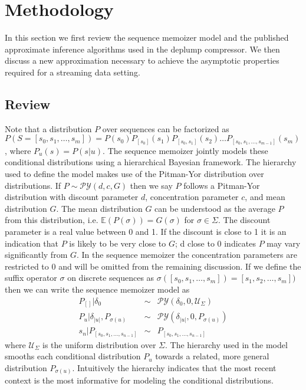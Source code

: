 \section{Methodology}
\label{section:methodology}
\newcommand{\PY}{\ensuremath{\mathcal{P}\mathcal{Y}}}

In this section we first review the sequence memoizer model and the published approximate inference algorithms used in the deplump compressor.  We then discuss a new approximation necessary to achieve the asymptotic properties required for a streaming data setting.

\subsection{Review}

Note that a distribution $P$ over sequences can be factorized as $P(S = [s_0, s_1, \ldots, s_m]) = P(s_0)P_{[s_0]}(s_1)P_{[s_0,s_1]}(s_2) \ldots P_{[s_0,s_1,\ldots,s_{m-1}]}(s_m)$, where $P_u(s) = P(s | u)$.  The sequence memoizer jointly models these conditional distributions using a hierarchical Bayesian framework.  The hierarchy used to define the model makes use of the Pitman-Yor \citep{Pitman1997} distribution over distributions. If $P \sim \PY(d,c,G)$ then we say $P$ follows a Pitman-Yor distribution with discount parameter $d$, concentration parameter $c$, and mean distribution $G$.  The mean distribution $G$ can be understood as the average $P$ from this distribution, i.e. $\mathbb{E}(P(\sigma)) = G(\sigma)$ for $\sigma \in \Sigma$.  The discount parameter is a real value between 0 and 1.  If the discount is close to 1 it is an indication that $P$ is likely to be very close to $G$; d close to 0 indicates $P$ may vary significantly from $G$.  In the sequence memoizer the concentration parameters are restricted to 0 and will be omitted from the remaining discussion. If we define the suffix operator $\sigma$ on discrete sequences as $\sigma([s_0, s_1, \ldots, s_m]) = [s_1,s_2, \ldots, s_m])$ then we can write the sequence memoizer model as 
%
\[
\begin{array}{rcl}
	P_{[ ]} 	|	\delta_0 					& \sim & \PY(\delta_0,0,\mathcal{U}_{\Sigma})\\
	P_{u} 	| 	\delta_{|u|}, P_{\sigma(u)} 	& \sim & \PY(\delta_{|u|}, 0, P_{\sigma(u)}) \\
	s_n 		|  	P_{[s_0, s_1, \ldots, s_{n-1}] }	& \sim & P_{[s_0, s_1, \ldots, s_{n-1}] }
\end{array}
\]
%
\noindent where $\mathcal{U}_{\Sigma}$ is the uniform distribution over $\Sigma$.  The hierarchy used in the model smooths each conditional distribution $P_u$ towards a related, more general distribution $P_{\sigma(u)}$.  Intuitively the hierarchy indicates that the most recent context is the most informative for modeling the conditional distributions.

